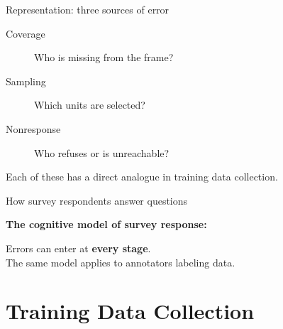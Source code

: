 \documentclass[aspectratio=169,11pt]{beamer}
\begin{document}
\begin{frame}{Representation: three sources of error}
\begin{description}
  \item[Coverage] Who is missing from the frame?
  \item[Sampling] Which units are selected?
  \item[Nonresponse] Who refuses or is unreachable?
\end{description}

\vspace{1em}

Each of these has a direct analogue in training data collection.
\end{frame}

\begin{frame}{How survey respondents answer questions}

\textbf{The cognitive model of survey response:}

\vspace{1em}

\begin{center}
\end{center}

\vspace{1em}

Errors can enter at \textbf{every stage}.\\
The same model applies to annotators labeling data.
\end{frame}


\section{Training Data Collection}
\end{document}
